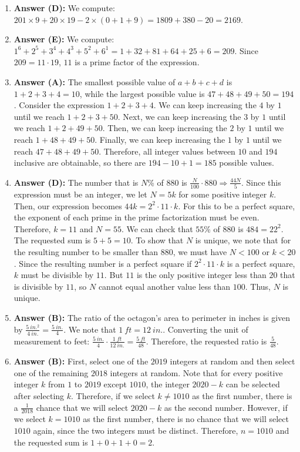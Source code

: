 \documentclass[12pt]{scrartcl}
\begin{document}
\begin{enumerate}
\item \textbf{Answer (D):} We compute: $201\times9+20\times19-2\times(0+1+9)=1809+380-20=2169$.

\item \textbf{Answer (E):} We compute: $1^{6}+2^{5}+3^{4}+4^{3}+5^{2}+6^{1}=1+32+81+64+25+6=209$. Since $209=11\cdot19$, $11$ is a prime factor of the expression.

\item \textbf{Answer (A):} The smallest possible value of $a+b+c+d$ is $1+2+3+4=10$, while the largest possible value is $47+48+49+50=194$. Consider the expression $1+2+3+4$. We can keep increasing the $4$ by $1$ until we reach $1+2+3+50$. Next, we can keep increasing the $3$ by $1$ until we reach $1+2+49+50$. Then, we can keep increasing the $2$ by $1$ until we reach $1+48+49+50$. Finally, we can keep increasing the $1$ by $1$ until we reach $47+48+49+50$. Therefore, all integer values between $10$ and $194$ inclusive are obtainable, so there are $194-10+1=185$ possible values.

\item \textbf{Answer (D):} The number that is $N$\% of $880$ is $\frac{N}{100}\cdot880\Rightarrow\frac{44N}{5}$. Since this expression must be an integer, we let $N=5k$ for some positive integer $k$. Then, our expression becomes $44k=2^{2}\cdot11\cdot k$. For this to be a perfect square, the exponent of each prime in the prime factorization must be even. Therefore, $k=11$ and $N=55$. We can check that $55$\% of $880$ is $484=22^{2}$. The requested sum is $5+5=10$. To show that $N$ is unique, we note that for the resulting number to be smaller than $880$, we must have $N<100$ or $k<20$. Since the resulting number is a perfect square if $2^{2}\cdot11\cdot k$ is a perfect square, $k$ must be divisible by $11$. But $11$ is the only positive integer less than $20$ that is divisible by $11$, so $N$ cannot equal another value less than $100$. Thus, $N$ is unique.

\item \textbf{Answer (B):} The ratio of the octagon's area to perimeter in inches is given by $\frac{5~in.^{2}}{4~in.}=\frac{5~in.}{4}$. We note that $1~ft=12~in.$. Converting the unit of measurement to feet: $\frac{5~in.}{4}\cdot\frac{1~ft}{12~in.}=\frac{5~ft}{48}$. Therefore, the requested ratio is $\frac{5}{48}$.

\item \textbf{Answer (B):} First, select one of the $2019$ integers at random and then select one of the remaining $2018$ integers at random. Note that for every positive integer $k$ from $1$ to $2019$ except $1010$, the integer $2020-k$ can be selected after selecting $k$. Therefore, if we select $k\ne1010$ as the first number, there is a $\frac{1}{2018}$ chance that we will select $2020-k$ as the second number. However, if we select $k=1010$ as the first number, there is no chance that we will select $1010$ again, since the two integers must be distinct. Therefore, $n=1010$ and the requested sum is $1+0+1+0=2$.


\end{enumerate}
\end{document}
